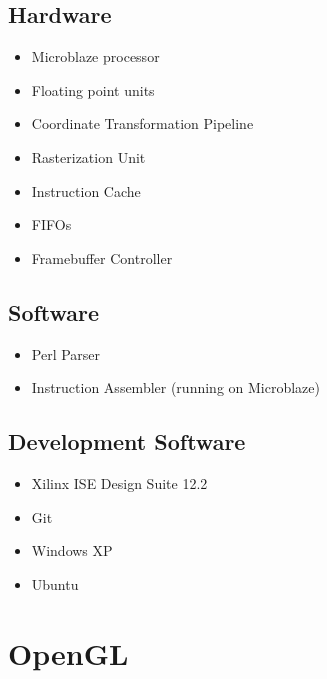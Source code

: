 \documentclass[letterpaper,10pt]{article}
\begin{document}
\subsection{Hardware}
\begin{itemize}

\item Microblaze processor

\item Floating point units

\item Coordinate Transformation Pipeline

\item Rasterization Unit

\item Instruction Cache

\item FIFOs

\item Framebuffer Controller

\end{itemize}

\subsection{Software}
\begin{itemize}

\item Perl Parser

\item Instruction Assembler (running on Microblaze)

\end{itemize}

\subsection{Development Software}
\begin{itemize}

\item Xilinx ISE Design Suite 12.2

\item Git

\item Windows XP

\item Ubuntu

\end{itemize}

\section{OpenGL}
\end{document}
